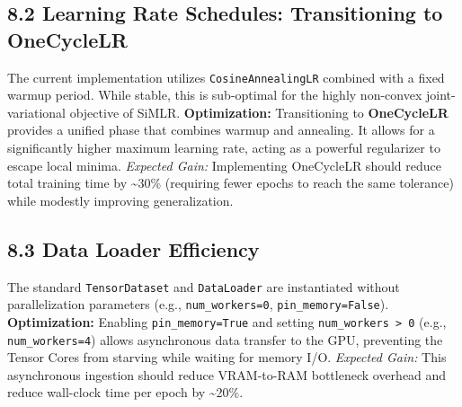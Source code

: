 \documentclass[
  letterpaper,
]{report}
\begin{document}
\subsection{8.2 Learning Rate Schedules: Transitioning to
OneCycleLR}\label{learning-rate-schedules-transitioning-to-onecyclelr}

The current implementation utilizes \texttt{CosineAnnealingLR} combined
with a fixed warmup period. While stable, this is sub-optimal for the
highly non-convex joint-variational objective of SiMLR.
\textbf{Optimization:} Transitioning to \textbf{OneCycleLR} provides a
unified phase that combines warmup and annealing. It allows for a
significantly higher maximum learning rate, acting as a powerful
regularizer to escape local minima. \emph{Expected Gain:} Implementing
OneCycleLR should reduce total training time by \textasciitilde30\%
(requiring fewer epochs to reach the same tolerance) while modestly
improving generalization.

\subsection{8.3 Data Loader Efficiency}\label{data-loader-efficiency}

The standard \texttt{TensorDataset} and \texttt{DataLoader} are
instantiated without parallelization parameters (e.g.,
\texttt{num\_workers=0}, \texttt{pin\_memory=False}).
\textbf{Optimization:} Enabling \texttt{pin\_memory=True} and setting
\texttt{num\_workers\ \textgreater{}\ 0} (e.g., \texttt{num\_workers=4})
allows asynchronous data transfer to the GPU, preventing the Tensor
Cores from starving while waiting for memory I/O. \emph{Expected Gain:}
This asynchronous ingestion should reduce VRAM-to-RAM bottleneck
overhead and reduce wall-clock time per epoch by \textasciitilde20\%.
\end{document}
